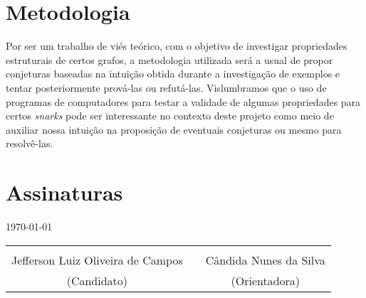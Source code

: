 \documentclass[12pt]{article}
\begin{document}
\section{Metodologia}

Por  ser um trabalho  de viés teórico, com  o objetivo  de investigar
propriedades  estruturais de  certos grafos,  a  metodologia utilizada
será a usual de propor  conjeturas baseadas na intuição obtida durante
a  investigação  de  exemplos  e tentar  posteriormente  prová-las  ou
refutá-las. Vislumbramos  que o uso de programas  de computadores para
testar a validade de  algumas propriedades para certos \textsl{snarks}
pode ser interessante no contexto  deste projeto como meio de auxiliar
nossa  intuição na proposição  de eventuais  conjeturas ou  mesmo para
resolvê-las.

 

	
\section{Assinaturas}
\today

\vspace{1.5cm}
\begin{tabular}{ccc}
 &  & \\
 Jefferson Luiz Oliveira de Campos & \hspace{4cm} & Cândida Nunes da Silva \\
 (Candidato) & & (Orientadora)  \\
\end{tabular}

% 

\end{document}
